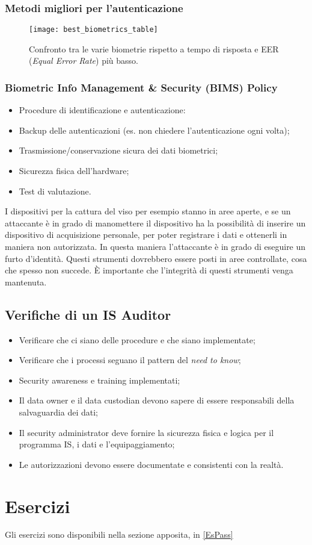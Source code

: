 \subsubsection{Metodi migliori per l'autenticazione}

\begin{figure}[H]
 \centering
 \texttt{[image: best\_biometrics\_table]}
 \caption{Confronto tra le varie biometrie rispetto a tempo di risposta e EER
(\emph{Equal Error Rate}) più basso. }
\end{figure}


\subsubsection{Biometric Info Management \& Security (BIMS) Policy}

\begin{itemize}
 \item Procedure di identificazione e autenticazione:
 \item Backup delle autenticazioni (es. non chiedere l'autenticazione ogni
 volta);
 \item Trasmissione/conservazione sicura dei dati biometrici;
 \item Sicurezza fisica dell'hardware;
 \item Test di valutazione.
\end{itemize}

I dispositivi per la cattura del viso per esempio stanno in aree aperte, e se
un attaccante è in grado di manomettere il dispositivo ha la possibilità di
inserire un dispositivo di acquisizione personale, per poter registrare i dati
e ottenerli in maniera non autorizzata. In questa maniera l'attaccante è in
grado di eseguire un furto d'identità. Questi strumenti dovrebbero essere posti
in aree controllate, cosa che spesso non succede. È importante che l'integrità
di questi strumenti venga mantenuta.

\subsection{Verifiche di un IS Auditor}
\begin{itemize}
 \item Verificare che ci siano delle procedure e che siano implementate;
 \item Verificare che i processi seguano il pattern del \textit{need to know};
 \item Security awareness e training implementati;
 \item Il data owner e il data custodian devono sapere di essere responsabili
 della salvaguardia dei dati;
 \item Il security administrator deve fornire la sicurezza fisica e logica per
 il programma IS, i dati e l'equipaggiamento;
 \item Le autorizzazioni devono essere documentate e consistenti con la realtà.
\end{itemize}


\section{Esercizi}

Gli esercizi sono disponibili nella sezione apposita, in \ref{EsPass}
